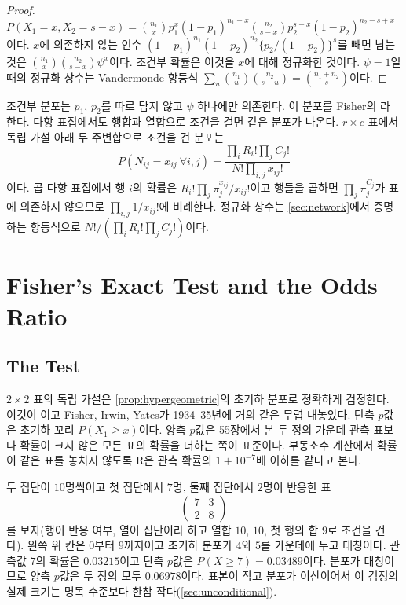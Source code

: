 \begin{proof}
$P(X_1=x,X_2=s-x)=\binom{n_1}xp_1^x(1-p_1)^{n_1-x}\binom{n_2}{s-x}p_2^{s-x}(1-p_2)^{n_2-s+x}$이다. $x$에 의존하지 않는 인수 $(1-p_1)^{n_1}(1-p_2)^{n_2}\{p_2/(1-p_2)\}^s$를 빼면 남는 것은 $\binom{n_1}x\binom{n_2}{s-x}\psi^x$이다. 조건부 확률은 이것을 $x$에 대해 정규화한 것이다. $\psi=1$일 때의 정규화 상수는 Vandermonde 항등식 $\sum_u\binom{n_1}u\binom{n_2}{s-u}=\binom{n_1+n_2}s$이다.
\end{proof}

조건부 분포는 $p_1$, $p_2$를 따로 담지 않고  $\psi$ 하나에만 의존한다. 이 분포를 Fisher의 라 한다. 다항 표집에서도 행합과 열합으로 조건을 걸면 같은 분포가 나온다. $r\times c$ 표에서 독립 가설 아래 두 주변합으로 조건을 건 분포는
\begin{equation}
\label{eq:rxc-prob}
P(N_{ij}=x_{ij}\ \forall i,j)=\frac{\prod_iR_i!\prod_jC_j!}{N!\prod_{i,j}x_{ij}!}
\end{equation}
이다. 곱 다항 표집에서 행 $i$의 확률은 $R_i!\prod_j\pi_j^{x_{ij}}/x_{ij}!$이고 행들을 곱하면 $\prod_j\pi_j^{C_j}$가 표에 의존하지 않으므로 $\prod_{i,j}1/x_{ij}!$에 비례한다. 정규화 상수는 \cref{sec:network}에서 증명하는 항등식으로 $N!/(\prod_iR_i!\prod_jC_j!)$이다.

\section{Fisher's Exact Test and the Odds Ratio}
\label{sec:fisher-exact}

\subsection{The Test}

$2\times2$ 표의 독립 가설은 \cref{prop:hypergeometric}의 초기하 분포로 정확하게 검정한다. 이것이 이고 Fisher, Irwin, Yates가 1934--35년에 거의 같은 무렵 내놓았다\cite{fisher1935logic,yates1934}. 단측 $p$값은 초기하 꼬리 $P(X_1\ge x)$이다. 양측 $p$값은 55장에서 본 두 정의 가운데 관측 표보다 확률이 크지 않은 모든 표의 확률을 더하는 쪽이 표준이다. 부동소수 계산에서 확률이 같은 표를 놓치지 않도록 R은 관측 확률의 $1+10^{-7}$배 이하를 같다고 본다.

두 집단이 $10$명씩이고 첫 집단에서 $7$명, 둘째 집단에서 $2$명이 반응한 표
\[
\begin{pmatrix}7&3\\2&8\end{pmatrix}
\]
를 보자(행이 반응 여부, 열이 집단이라 하고 열합 $10$, $10$, 첫 행의 합 $9$로 조건을 건다). 왼쪽 위 칸은 $0$부터 $9$까지이고 초기하 분포가 $4$와 $5$를 가운데에 두고 대칭이다. 관측값 $7$의 확률은 $0.03215$이고 단측 $p$값은 $P(X\ge7)=0.03489$이다. 분포가 대칭이므로 양측 $p$값은 두 정의 모두 $0.06978$이다. 표본이 작고 분포가 이산이어서 이 검정의 실제 크기는 명목 수준보다 한참 작다(\cref{sec:unconditional}).

